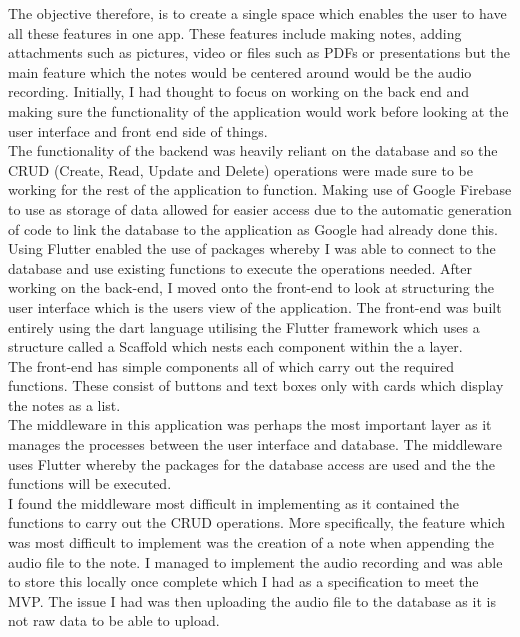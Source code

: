 \documentclass[oneside]{report}
\begin{document}
The objective therefore, is to create a single space which enables the user to have all these features in one app. These features include making notes, adding attachments such as pictures, video or files such as PDFs or presentations but the main feature which the notes would be centered around would be the audio recording. Initially, I had thought to focus on working on the back end and making sure the functionality of the application would work before looking at the user interface and front end side of things.\\

The functionality of the backend was heavily reliant on the database and so the CRUD (Create, Read, Update and Delete) operations were made sure to be working for the rest of the application to function. Making use of Google Firebase to use as storage of data allowed for easier access due to the automatic generation of code to link the database to the application as Google had already done this. \\

Using Flutter enabled the use of packages whereby I was able to connect to the database and use existing functions to execute the operations needed. After working on the back-end, I moved onto the front-end to look at structuring the user interface which is the users view of the application. The front-end was built entirely using the dart language utilising the Flutter framework which uses a structure called a Scaffold which nests each component within the a layer. \\

The front-end has simple components all of which carry out the required functions. These consist of buttons and text boxes only with cards which display the notes as a list.\\

The middleware in this application was perhaps the most important layer as it manages the processes between the user interface and database. The middleware uses Flutter whereby the packages for the database access are used and the the functions will be executed. \\

I found the middleware most difficult in implementing as it contained the functions to carry out the CRUD operations. More specifically, the feature which was most difficult to implement was the creation of a note when appending the audio file to the note. I managed to implement the audio recording and was able to store this locally once complete which I had as a specification to meet the MVP. The issue I had was then uploading the audio file to the database as it is not raw data to be able to upload. \\
\end{document}
